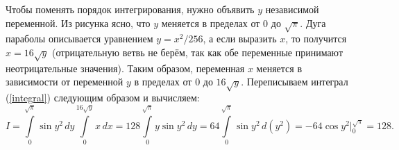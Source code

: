 \documentclass[12pt]{article}
\begin{document}
\noindent Чтобы поменять порядок интегрирования, нужно объявить $y$ независимой переменной. Из рисунка ясно, что $y$ меняется в пределах от $0$ до $\sqrt\pi$. Дуга параболы описывается уравнением $y = x^2/256$, а если выразить $x$, то получится $x = 16\sqrt{y}$ (отрицательную ветвь не берём, так как обе переменные принимают неотрицательные значения). Таким образом, переменная $x$ меняется в зависимости от переменной $y$ в пределах от $0$ до $16\sqrt{y}$. Переписываем интеграл (\ref{integral}) следующим образом и вычисляем:
\begin{equation*}
    I = \int\limits_0^{\sqrt{\pi}}\sin{y^2}\, dy \int\limits_{0}^{16\sqrt{y}} x\,dx = 128\int\limits_0^{\sqrt{\pi}}y\sin{y^2}\, dy = 64\int\limits_0^{\sqrt{\pi}} \sin{y^2}\,d(y^2) = -64\cos{y^2} \bigg|_0^{\sqrt{\pi}} = 128.
\end{equation*}
\end{document}
